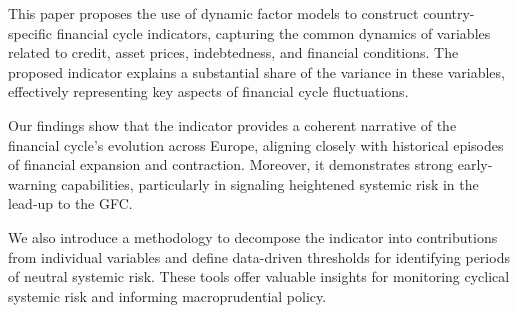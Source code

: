 This paper proposes the use of dynamic factor models to construct country-specific financial cycle indicators, capturing the common dynamics of variables related to credit, asset prices, indebtedness, and financial conditions. The proposed indicator explains a substantial share of the variance in these variables, effectively representing key aspects of financial cycle fluctuations.

Our findings show that the indicator provides a coherent narrative of the financial cycle’s evolution across Europe, aligning closely with historical episodes of financial expansion and contraction. Moreover, it demonstrates strong early-warning capabilities, particularly in signaling heightened systemic risk in the lead-up to the GFC.

We also introduce a methodology to decompose the indicator into contributions from individual variables and define data-driven thresholds for identifying periods of neutral systemic risk. These tools offer valuable insights for monitoring cyclical systemic risk and informing macroprudential policy.